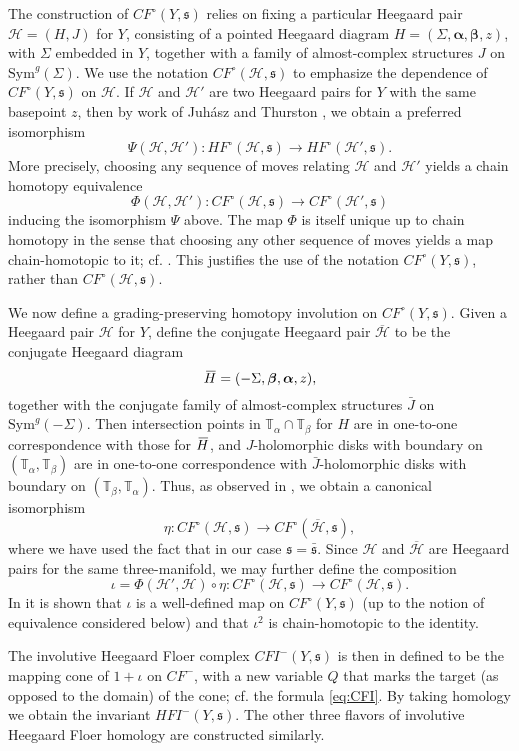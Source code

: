 \documentclass[11 pt]{amsart}
\theoremstyle{remark}
\def\H{\mathcal{H}}
\newcommand \bJ {\bar{J}}
\newcommand \bh {\mkern3mu \overline{\mkern-3mu H \mkern-1mu} \mkern1mu}
\newcommand \bH {\overline{\H}}
\newcommand\Ta{\mathbb{T}_\alpha}
\newcommand\Tb{\mathbb{T}_\beta}
\def\Sym{\mathrm{Sym}}
\def\s{\mathfrak s}
\newcommand\alphas{\boldsymbol\alpha}
\newcommand\betas{\boldsymbol\beta}
\def\bs{\bar{\mathfrak{\s}}}
\def\CF {\mathit{CF}}
\def\HF {\mathit{HF}}
\newcommand \CFm {\CF^-}
\newcommand \CFo {\CF^{\circ}}
\newcommand \HFo {\HF^{\circ}}
\def\CFI {\mathit{CFI}}
\def\HFI {\mathit{HFI}}
\newcommand \CFIm {\CFI^-}
\newcommand \HFIm {\HFI^-}
\def\inv{\iota}
\begin{document}
The construction of $\CFo(Y, \s)$ relies on fixing a particular Heegaard pair $\H = (H, J)$ for $Y$, consisting of a pointed Heegaard diagram $H = (\Sigma, \alphas, \betas, z)$, with $\Sigma$ embedded in $Y$, together with a family of almost-complex structures $J$ on $\Sym^g(\Sigma)$. We use the notation $\CFo(\H, \s)$ to emphasize the dependence of $\CFo(Y, \s)$ on $\H$. If $\H$ and $\H'$ are two Heegaard pairs for $Y$ with the same basepoint $z$, then by work of Juh\'asz and Thurston \cite{Naturality}, we obtain a preferred isomorphism 
$$ \Psi(\H, \H'): \HFo(\H, \s) \rightarrow \HFo(\H', \s). $$
More precisely, choosing any sequence of moves relating $\H$ and $\H'$ yields a chain homotopy equivalence 
$$ \Phi(\H, \H'): \CFo(\H, \s) \rightarrow \CFo(\H', \s) $$
inducing the isomorphism $\Psi$ above. The map $\Phi$ is itself unique up to chain homotopy in the sense that choosing any other sequence of moves yields a map chain-homotopic to it; cf. \cite[Proposition 2.3]{HMinvolutive}. This justifies the use of the notation $\CFo(Y, \s)$, rather than $\CFo(\H, \s)$.

We now define a grading-preserving homotopy involution on $\CFo(Y, \s)$. Given a Heegaard pair $\H$ for $Y$, define the conjugate Heegaard pair $\bH$ to be the conjugate Heegaard diagram
$$ \bh = (-\Sigma, \betas, \alphas, z), $$
together with the conjugate family of almost-complex structures $\bJ$ on $\Sym^g(-\Sigma)$. Then intersection points in $\Ta \cap \Tb$ for $H$ are in one-to-one correspondence with those for $\bh$, and $J$-holomorphic disks with boundary on $(\Ta, \Tb)$ are in one-to-one correspondence with $\bJ$-holomorphic disks with boundary on $(\Tb, \Ta)$. Thus, as observed in \cite[Theorem 2.4]{HolDiskTwo}, we obtain a canonical isomorphism
$$ \eta: \CFo(\H, \s) \rightarrow \CFo(\bH, \s), $$
where we have used the fact that in our case $\s = \bs$. Since $\H$ and $\bH$ are Heegaard pairs for the same three-manifold, we may further define the composition
$$ \inv = \Phi(\H', \H) \circ \eta: \CFo(\H, \s) \rightarrow \CFo(\H, \s). $$
In \cite[Section 2.2]{HMinvolutive} it is shown that $\inv$ is a well-defined map on $\CFo(Y, \s)$ (up to the notion of equivalence considered below) and that $\inv^2$ is chain-homotopic to the identity.

The involutive Heegaard Floer complex $\CFIm(Y, \s)$ is then in \cite{HMinvolutive} defined to be the mapping cone of $1 + \inv$ on $\CFm$, with a new variable $Q$ that marks the target (as opposed to the domain) of the cone; cf. the formula \eqref{eq:CFI}. By taking homology we obtain the invariant $\HFIm(Y, \s)$. The other three flavors of involutive Heegaard Floer homology are constructed similarly.
\end{document}
